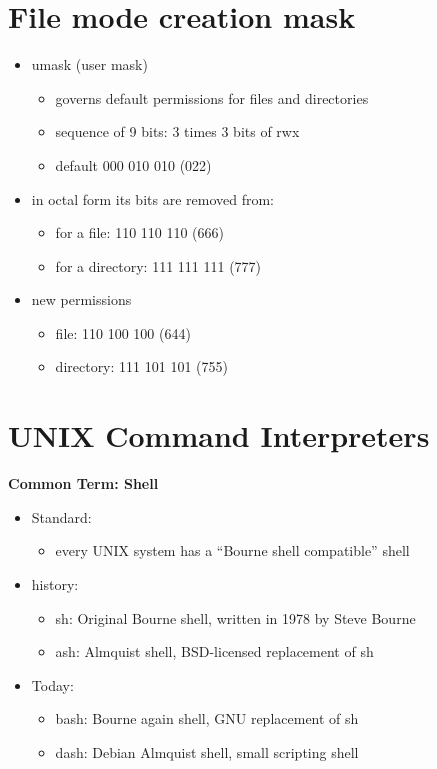 \documentclass{report}
\begin{document}
\section{File mode creation mask}
\begin{itemize}
  \item umask (user mask)
    \begin{itemize}[label=$\circ$]
      \item governs default permissions for files and directories
      \item sequence of 9 bits: 3 times 3 bits of rwx
      \item default 000 010 010 (022)
    \end{itemize}
  \item in octal form its bits are removed from:
    \begin{itemize}[label=$\circ$]
      \item for a file: \hspace{10mm} 110 110 110 (666)
      \item for a directory: \hspace{1mm} 111 111 111 (777)
    \end{itemize}
  \item new permissions
    \begin{itemize}[label=$\circ$]
      \item file: 110 100 100 (644)
      \item directory: 111 101 101 (755)
    \end{itemize}
\end{itemize}
\section{UNIX Command Interpreters}
\textbf{Common Term: Shell}
\begin{itemize}
  \item Standard:  
    \begin{itemize}[label=$\circ$]
      \item every UNIX system has a ``Bourne shell compatible'' shell
    \end{itemize}
  \item history:
    \begin{itemize}[label=$\circ$]
      \item sh: Original Bourne shell, written in 1978 by Steve Bourne
      \item ash: Almquist shell, BSD-licensed replacement of sh
    \end{itemize}
  \item Today:
    \begin{itemize}[label=$\circ$]
      \item bash: Bourne again shell, GNU replacement of sh
      \item dash: Debian Almquist shell, small scripting shell
    \end{itemize}
\end{itemize}
\end{document}

